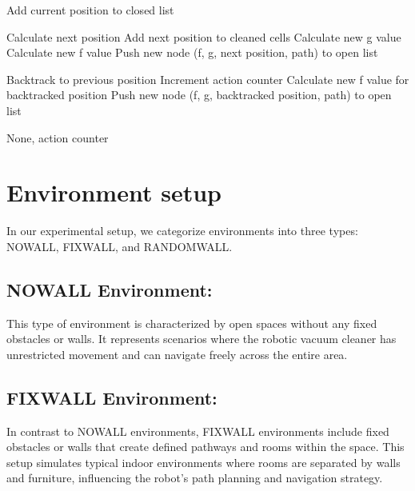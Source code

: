 \documentclass{article}
\begin{document}
\begin{algorithm}[H]
\begin{algorithmic}[1]
            \State Add current position to closed list
    
                \State Calculate next position
                    \State Add next position to cleaned cells
                    \State Calculate new g value
                    \State Calculate new f value
                    \State Push new node (f, g, next position, path) to open list
                \EndIf
            \EndFor
    
                \State Backtrack to previous position
                \State Increment action counter
                    \State Calculate new f value for backtracked position
                    \State Push new node (f, g, backtracked position, path) to open list
                \EndIf
            \EndIf
        \EndWhile
    
        \State \Return None, action counter
    \EndFunction
    \end{algorithmic}
    \end{algorithm}
  
    
\section{Environment setup}

In our experimental setup, we categorize environments into three types: NOWALL, FIXWALL, and RANDOMWALL.

\subsection{NOWALL Environment:} This type of environment is characterized by open spaces without any fixed obstacles or walls. It represents scenarios where the robotic vacuum cleaner has unrestricted movement and can navigate freely across the entire area.

\subsection{FIXWALL Environment:} In contrast to NOWALL environments, FIXWALL environments include fixed obstacles or walls that create defined pathways and rooms within the space. This setup simulates typical indoor environments where rooms are separated by walls and furniture, influencing the robot's path planning and navigation strategy.
\end{document}
